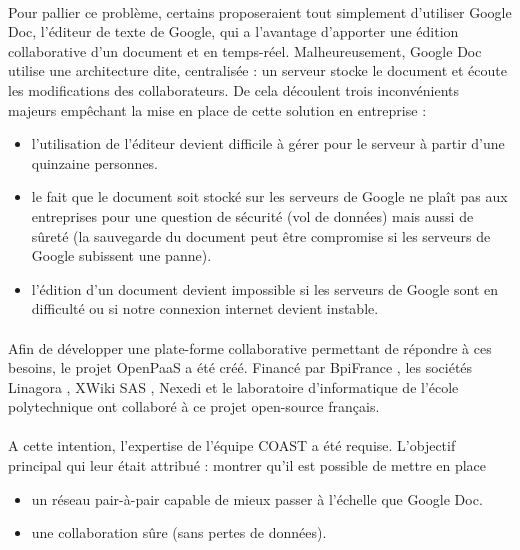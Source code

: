 \documentclass[12pt]{article}
\begin{document}
\paragraph{}
Pour pallier ce problème, certains proposeraient tout simplement d'utiliser Google Doc, l'éditeur de texte de Google, qui a l'avantage d'apporter une édition collaborative d'un document et en temps-réel. Malheureusement, Google Doc utilise une architecture dite, centralisée : un serveur stocke le document et écoute les modifications des collaborateurs. De cela découlent trois inconvénients majeurs empêchant la mise en place de cette solution en entreprise :\\
\begin{itemize}
    \item l'utilisation de l'éditeur devient difficile à gérer pour le serveur à partir d'une quinzaine personnes.
    \item le fait que le document soit stocké sur les serveurs de Google ne plaît pas aux entreprises pour une question de sécurité (vol de données) mais aussi de sûreté (la sauvegarde du document peut être compromise si les serveurs de Google subissent une panne).
    \item l'édition d'un document devient impossible si les serveurs de Google sont en difficulté ou si notre connexion internet devient instable.
\end{itemize}
\paragraph{}
Afin de développer une plate-forme collaborative permettant de répondre à ces besoins, le projet OpenPaaS \cite{openpaas} a été créé. Financé par BpiFrance \cite{bpi}, les sociétés Linagora \cite{linagora}, XWiki SAS \cite{xwiki}, Nexedi \cite{nexedi} et le laboratoire d'informatique de l'école polytechnique ont collaboré à ce projet open-source français.
\paragraph{}
A cette intention, l'expertise de l'équipe COAST a été requise. L'objectif principal qui leur était attribué : montrer qu'il est possible de mettre en place
\begin{itemize}
    \item un réseau pair-à-pair capable de mieux passer à l'échelle que Google Doc.
    \item une collaboration sûre (sans pertes de données).
\end{itemize}
\end{document}
